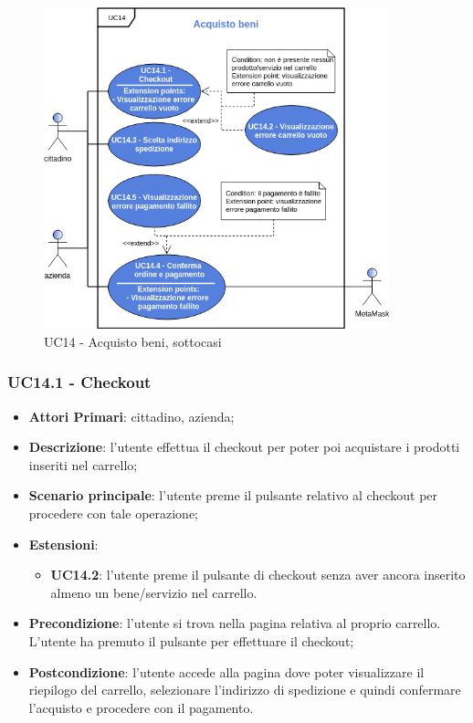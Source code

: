 \begin{figure}[h]
	\includegraphics[width=10cm]{res/images/UC7OK.png}
	\centering
	\caption{UC14 - Acquisto beni, sottocasi}
\end{figure}
\subsubsection{UC14.1 - Checkout}
\begin{itemize}
	\item \textbf{Attori Primari}: cittadino, azienda;
	\item \textbf{Descrizione}: l'utente effettua il checkout per poter poi acquistare i prodotti inseriti nel carrello;
	\item \textbf{Scenario principale}: l'utente preme il pulsante relativo al checkout per procedere con tale operazione;
	\item \textbf{Estensioni}: 
	\begin{itemize}
		\item \textbf{UC14.2}: l'utente preme il pulsante di checkout senza aver ancora inserito almeno un bene/servizio nel carrello.
	\end{itemize}
	\item \textbf{Precondizione}: l'utente si trova nella pagina relativa al proprio carrello. L'utente ha premuto il pulsante per effettuare il checkout;
	\item \textbf{Postcondizione}: l'utente accede alla pagina dove poter visualizzare il riepilogo del carrello, selezionare l'indirizzo di spedizione e quindi confermare l'acquisto e procedere con il pagamento.
\end{itemize}

